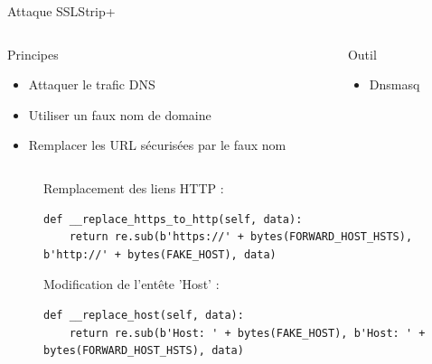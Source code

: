 \begin{frame}[fragile]{Attaque SSLStrip+}
  \begin{columns}
    \begin{column}{0.7\textwidth}
      \begin{block}{Principes}
        \begin{itemize}
        \item{Attaquer le trafic DNS}
        \item{Utiliser un faux nom de domaine}
        \item{Remplacer les URL sécurisées par le faux nom}
        \end{itemize}
      \end{block}
    \end{column}
    \begin{column}{0.3\textwidth}
    \begin{exampleblock}{Outil }
      \begin{itemize}
      \item{Dnsmasq}
      \end{itemize}
    \end{exampleblock}

    \end{column}
  \end{columns}
  \begin{figure}
    Remplacement des liens HTTP :
    \begin{verbatim}
def __replace_https_to_http(self, data):
    return re.sub(b'https://' + bytes(FORWARD_HOST_HSTS), b'http://' + bytes(FAKE_HOST), data)
        \end{verbatim}
        Modification de l'entête 'Host' :
        \begin{verbatim}
def __replace_host(self, data):
    return re.sub(b'Host: ' + bytes(FAKE_HOST), b'Host: ' + bytes(FORWARD_HOST_HSTS), data)
        \end{verbatim}
      \end{figure}

\end{frame}

